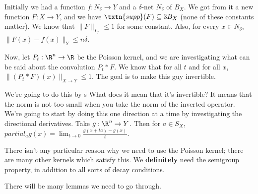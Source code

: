 

Initially we had a function $f: N_{\delta} \to Y$ and a $\delta$-net $N_{\delta}$ of $B_X$. We got from it a new function $F: X \to Y$, and we have $\txtn{supp}(F) \subseteq 3 B_X$ (none of these constants matter). We know that $\|F\|_{L_p} \le 1$ for some constant. Also, for every $x \in N_{\delta}$, $\|F(x) - f(x)\|_Y \leq n\delta$. 

Now, let $P_t: \R^n \to \R$ be the Poisson kernel, and we are investigating what can be said about the convolution $P_t * F$. We know that for all $t$ and for all $x$, $\|(P_t * F)(x)\|_{X \to Y} \le 1$. The goal is to make this guy invertible. 

We're going to do this by s What does it mean that it's invertible? It means that the norm is not too small when you take the norm of the inverted operator. We're going to start by doing this one direction at a time by investigating the directional derivatives. Take $g: \R^n \to Y$. Then for $a \in S_X$, $partial_a g(x) = \lim_{t \to 0} \frac{g(x + ta) - g(x)}{t}$. 

There isn't any particular reason why we need to use the Poisson kernel; there are many other kernels which satisfy this. We \textbf{definitely} need the semigroup property, in addition to all sorts of decay conditions. 

There will be many lemmas we need to go through. 

